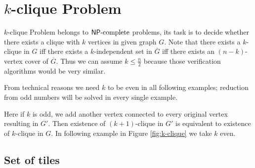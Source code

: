 \section{$k$-clique Problem}


$k$-clique Problem belongs to $\mathsf{NP}\textnormal{-complete}$ problems, its task is to decide whether there exists a clique with $k$ vertices in given graph $G$. Note that there exists a $k$-clique in $G$ iff there exists a $k$-independent set in $\overline{G}$ iff there exists an $(n-k)$-vertex cover of $\overline{G}$. Thus we can assume $k \leq \frac{n}{2}$ because those verification algorithms would be very similar.

From technical reasons we need $k$ to be even in all following examples; reduction from odd numbers will be solved in every single example.

Here if $k$ is odd, we add another vertex connected to every original vertex resulting in $G'$. Then existence of $(k+1)$-clique in $G'$ is equivalent to existence of $k$-clique in $G$. In following example in Figure \ref{fig:k-clique} we take $k$ even.



\subsection*{Set of tiles}

